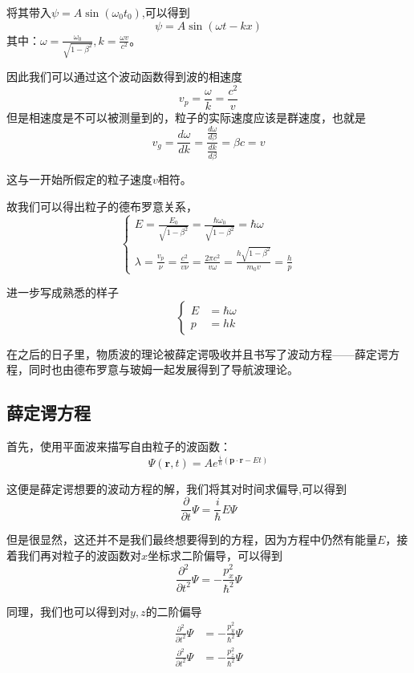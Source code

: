 \documentclass{article}
\begin{document}
将其带入$\psi=A\sin(\omega_0t_0)$,可以得到
\[\psi = A\sin(\omega t-kx)\]
其中：$\omega = \frac{\omega_0}{\sqrt{1-\beta^2}},k=\frac{\omega v}{c^2}$。

因此我们可以通过这个波动函数得到波的相速度
\[v_p=\frac{\omega}{k}=\frac{c^2}{v}\]
但是相速度是不可以被测量到的，粒子的实际速度应该是群速度，也就是
\[v_g=\frac{d\omega}{dk}=\frac{\frac{d\omega}{d\beta}}{\frac{dk}{d\beta}}=\beta c=v\]

这与一开始所假定的粒子速度$v$相符。

故我们可以得出粒子的德布罗意关系，
\begin{equation*}
    \begin{cases}
        E = \frac{E_0}{\sqrt{1-\beta^2}} = \frac{\hbar\omega_0}{\sqrt{1-\beta^2}} = \hbar\omega\\
        \lambda = \frac{v_p}{\nu}=\frac{c^2}{v\nu}=\frac{2\pi c^2}{v\omega}=\frac{h\sqrt{1-\beta^2}}{m_0v}=\frac{h}{p}
    \end{cases}
\end{equation*}

进一步写成熟悉的样子
\begin{equation*}
    \begin{cases}
        E&=\hbar\omega\\
        p&=hk
    \end{cases}
\end{equation*}


在之后的日子里，物质波的理论被薛定谔吸收并且书写了波动方程——薛定谔方程，同时也由德布罗意与玻姆一起发展得到了导航波理论。

\subsection{薛定谔方程}
首先，使用平面波来描写自由粒子的波函数：
\[
    \Psi(\textbf{r},t)=Ae^{\frac{i}{\hbar}(\textbf{p}\cdot\textbf{r}-Et)}
\]

这便是薛定谔想要的波动方程的解，我们将其对时间求偏导,可以得到
\[\frac{\partial }{\partial t}\Psi=\frac{i}{\hbar}E\Psi\]

但是很显然，这还并不是我们最终想要得到的方程，因为方程中仍然有能量$E$，接着我们再对粒子的波函数对$x$坐标求二阶偏导，可以得到
\[\frac{\partial^2}{\partial t^2}\Psi=-\frac{p_x^2}{\hbar^2}\Psi\]

同理，我们也可以得到对$y,z$的二阶偏导
\begin{align*}
    \frac{\partial^2}{\partial t^2}\Psi&=-\frac{p_y^2}{\hbar^2}\Psi\\
    \frac{\partial^2}{\partial t^2}\Psi&=-\frac{p_z^2}{\hbar^2}\Psi\\
\end{align*}
\end{document}
